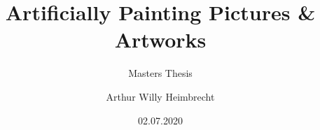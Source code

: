 \documentclass[
	fontsize=12pt, %
	twoside=true, %
	numbers=noenddot, %
]{kaobook}
\begin{document}

\titlehead{Universität Heidelberg}
\subject{Fakultät für Physik}

\title[Artificially Painting]{Artificially Painting Pictures \& Artworks}
\subtitle{Masters Thesis}

\author[Arthur Willy Heimbrecht]{Arthur Willy Heimbrecht}

\date{02.07.2020}

\publishers{supervised by Professors Björn Ommer and Tilman Plehn}



\frontmatter %







\end{document}
